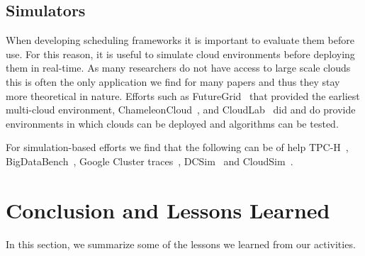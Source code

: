 \documentclass[final,5p,times,twocolumn]{elsarticle}
\begin{document}
\subsection{Simulators}
\label{sec:simulators}

When developing scheduling frameworks it is important to evaluate them before use. For this reason, it is useful to simulate cloud environments before deploying them in real-time. As many researchers do not have access to large scale clouds this is often the only application we find for many papers and thus they stay more theoretical in nature. Efforts such as FutureGrid~\cite{las12fg-bookchapter} that provided the earliest multi-cloud environment,
ChameleonCloud~\cite{Chameleoncloud2019}, and CloudLab~\cite{www-cloudlab} did and do provide environments in which clouds can be deployed and algorithms can be tested.

For simulation-based efforts we find that the following can be of help TPC-H~\cite{www-tpc-h}, BigDataBench~\cite{bigdatabench}, Google
Cluster traces~\cite{www-google-cluster-traces}, DCSim~\cite{www-dcsim}
and CloudSim~\cite{www-cloudsim}.





\section{Conclusion and Lessons Learned}\label{sec:conclusion}



In this section, we summarize some of the lessons we learned from our activities.
\end{document}
